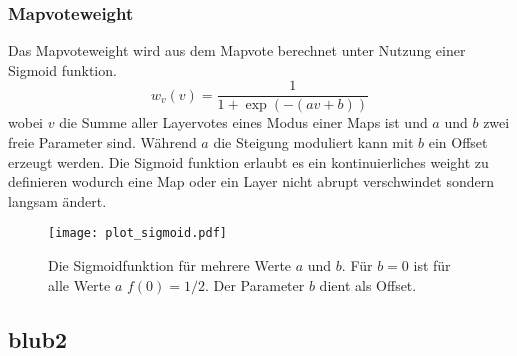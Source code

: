     \subsubsection{Mapvoteweight}
        Das Mapvoteweight wird aus dem Mapvote berechnet unter Nutzung einer Sigmoid funktion. 
        \begin{equation}
            w_v(v) = \frac{1}{1+\exp\left(-(av+b)\right)}
        \end{equation}
        wobei $v$ die Summe aller Layervotes eines Modus einer Maps ist und $a$ und $b$ zwei freie Parameter sind.
        Während $a$ die Steigung moduliert kann mit $b$ ein Offset erzeugt werden.
        Die Sigmoid funktion erlaubt es ein kontinuierliches weight zu definieren wodurch eine Map oder ein Layer nicht abrupt verschwindet sondern langsam ändert.
        \begin{figure}
            \centering
            \texttt{[image: plot\_sigmoid.pdf]}
            \caption{Die Sigmoidfunktion für mehrere Werte $a$ und $b$. 
                        Für $b=0$ ist für alle Werte $a$ $f(0)=1/2$.
                        Der Parameter $b$ dient als Offset.}
        \end{figure}
    \subsection{blub2}
